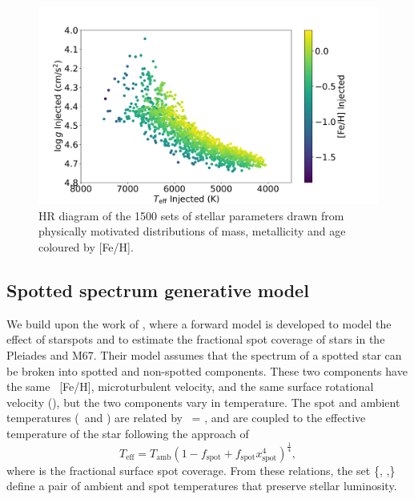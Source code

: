 \begin{figure}
    \includegraphics[width=\textwidth]{Figures/ss_chapter_figures/injected_hr.png}
    \caption{HR diagram of the 1500 sets of stellar parameters drawn from physically motivated distributions of mass, metallicity and age coloured by [Fe/H].}
    \label{fig:HR}
\end{figure}


\subsection{Spotted spectrum generative model}

\label{sec:gen}
We build upon the work of \citep{cao_starspots_2022}, where a forward model is developed to model the effect of starspots and to estimate the fractional spot coverage of stars in the Pleiades and M67. Their model assumes that the spectrum of a spotted star can be broken into spotted and non-spotted components. These two components have the same \logg\, [Fe/H], microturbulent velocity, and the same surface rotational velocity (\vsini), but the two components vary in temperature. The spot and ambient temperatures (\tspot\ and \tamb) are related by \tspot\  = \xspot \tamb, and are coupled to the effective temperature of the star following the approach of \citet{somers_impact_2015}
\begin{equation}
    T_{\text{eff}} = T_{\text{amb}}(1 - f_{\text{spot}} + f_{\text{spot}}x_{\text{spot}}^{4} )^{\frac{1}{4}},
    \label{eq:teff}
\end{equation}
where \fspot is the fractional surface spot coverage. From these relations, the set \{\teff, \xspot,\fspot\} define a pair of ambient and spot temperatures that preserve stellar luminosity.


